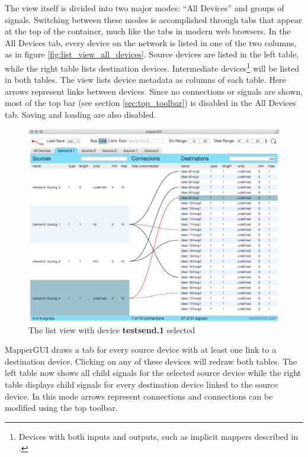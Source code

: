The view itself is divided into two major modes: ``All Devices'' and groups of signals. Switching between these modes is accomplished through tabs that appear at the top of the container, much like the tabs in modern web browsers. In the All Devices tab, every device on the network is listed in one of the two columns, as in figure \ref{fig:list_view_all_devices}. Source devices are listed in the left table, while the right table lists destination devices. Intermediate devices\footnote{Devices with both inputs and outputs, such as implicit mappers described in .} will be listed in both tables. The view lists device metadata as columns of each table. Here arrows represent links between devices. Since no connections or signals are shown, most of the top bar (see section \ref{sec:top_toolbar}) is disabled in the All Devices tab. Saving and loading are also disabled.

\begin{figure}[ht]
\centering
	\includegraphics[width=1\textwidth]{figures/list_view_single_link}
\caption{The list view with device \textbf{testsend.1} selected}
\label{fig:list_view_single_link}
\end{figure}

MapperGUI draws a tab for every source device with at least one link to a destination device. Clicking on any of these devices will redraw both tables. The left table now shows all child signals for the selected source device while the right table displays child signals for every destination device linked to the source device. In this mode arrows represent connections and connections can be modified using the top toolbar.

